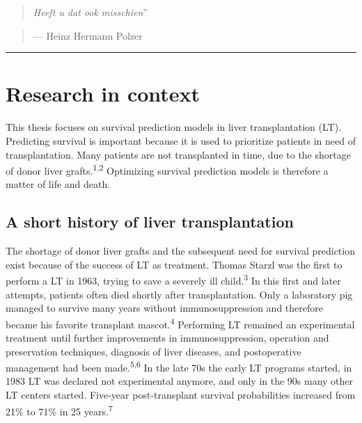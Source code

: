 \documentclass[11pt,english,]{book} %
\begin{document}
\begin{quote}
\emph{Heeft u dat ook misschien}''
\end{quote}

\begin{quote}
--- Heinz Hermann Polzer
\end{quote}

\begin{center}\rule{0.5\linewidth}{0.5pt}\end{center}

\newpage
\nopagecolor
\color{black}
\linespread{1.213}

\hypertarget{research-in-context}{%
\section*{Research in context}\label{research-in-context}}

This thesis focuses on survival prediction models in liver transplantation (LT). Predicting survival is important because it is used to prioritize patients in need of transplantation. Many patients are not transplanted in time, due to the shortage of donor liver grafts.\textsuperscript{1,2} Optimizing survival prediction models is therefore a matter of life and death.

\hypertarget{a-short-history-of-liver-transplantation}{%
\subsection*{A short history of liver transplantation}\label{a-short-history-of-liver-transplantation}}

The shortage of donor liver grafts and the subsequent need for survival prediction exist because of the success of LT as treatment. Thomas Starzl was the first to perform a LT in 1963, trying to save a severely ill child.\textsuperscript{3} In this first and later attempts, patients often died shortly after transplantation. Only a laboratory pig managed to survive many years without immunosuppression and therefore became his favorite transplant mascot.\textsuperscript{4} Performing LT remained an experimental treatment until further improvements in immunosuppression, operation and preservation techniques, diagnosis of liver diseases, and postoperative management had been made.\textsuperscript{5,6} In the late 70s the early LT programs started, in 1983 LT was declared not experimental anymore, and only in the 90s many other LT centers started. Five-year post-transplant survival probabilities increased from 21\% to 71\% in 25 years.\textsuperscript{7}
\end{document}
